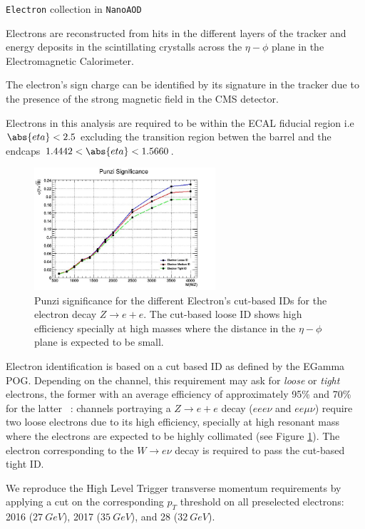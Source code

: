 \verb|Electron| collection in \verb|NanoAOD|

Electrons are reconstructed from hits in the different
layers of the tracker and energy deposits in the scintillating crystalls
across the $\eta-\phi$ plane in the Electromagnetic Calorimeter.

The electron's sign charge can be identified by its signature in the tracker
due to the presence of the strong magnetic field in the CMS detector.

Electrons in this analysis are required to be within the ECAL fiducial
region i.e $\abs{eta}<2.5$ excluding the transition region betwen the
barrel and the endcaps $1.4442<\abs{eta}<1.5660$.

\begin{figure}[tph]
  \centering
  \includegraphics[width=0.6\textwidth]{fig/LeptonIDStudies/ElectronIDPunzi.png}
  \caption{Punzi significance for the different Electron's cut-based IDs for the
    electron decay $Z\rightarrow e+e$. The cut-based loose ID shows high efficiency
    specially at high masses where the distance in the $\eta-\phi$ plane is
    expected to be small.}
  \label{fig:PunziElectronIDs}
\end{figure}

Electron identification is based on a cut based ID as defined by the
EGamma POG. Depending on the channel, this requirement
may ask for \emph{loose} or \emph{tight} electrons, the former with an
average efficiency of approximately 95\% and 70\% for
the latter ~\cite{EGammaPOG_el}: channels portraying a $Z\rightarrow e+e$
decay ($eee\nu$ and $ee\mu\nu$) require two loose
electrons due to its high efficiency, specially at high resonant mass where
the electrons are expected to be highly collimated (see Figure \ref{fig:PunziElectronIDs}).
The electron corresponding to the $W\rightarrow e\nu$ decay is required to pass
the cut-based tight ID.

We reproduce the High Level Trigger transverse momentum requirements by
applying a cut on the corresponding $p_T$ threshold on all
preselected electrons:
2016 ($27~GeV$), 2017 ($35~GeV$), and 28 ($32~GeV$).


